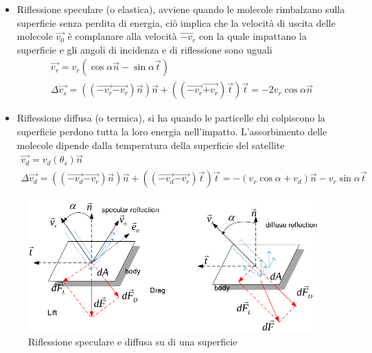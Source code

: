 \begin{itemize}
  \item Riflessione speculare (o elastica), avviene quando le molecole
  rimbalzano sulla superficie senza perdita di energia, ciò implica che la
  velocità di uscita delle molecole $\vec{v_0}$ è complanare alla velocità
  $\vec{-v_r}$ con la quale impattano la superficie e gli angoli di incidenza e
  di riflessione sono uguali
\begin{equation}
\begin{array}{l}
\vec{v_r}=v_r(\cos{\alpha \vec{n}}-\sin{\alpha \vec{t}}) \\
\Delta \vec{v_s}=((\vec{-v_r}\vec{-v_r})\vec{n})\vec{n} +
((\vec{-v_r}\vec{+v_r})\vec{t})\vec{t} = -2v_r\cos{\alpha \vec{n}}
\end{array}
\label{eq:specular}
\end{equation}
  \item Riflessione diffusa (o termica), si ha quando le particelle chi
  colpiscono la superficie perdono tutta la loro energia nell'impatto.
  L'assorbimento delle molecole dipende dalla temperatura della superficie del
  satellite
\begin{equation}
\begin{array}{l}
\vec{v_d}=v_d(\theta_s)\vec{n} \\
\Delta\vec{v_d}=((\vec{-v_d}\vec{-v_r})\vec{n})\vec{n} +
((\vec{-v_d}\vec{-v_r})\vec{t})\vec{t}
= -(v_r\cos{\alpha}+v_d)\vec{n}-v_r\sin{\alpha}\vec{t}
\end{array}
\label{eq:diffusion}
\end{equation}
\end{itemize}

\begin{figure}[htp]
\begin{center}
  \includegraphics[width=\textwidth]{modelling/orbit_dynamics/image/riflessione.png}
  \caption{Riflessione speculare e diffusa su di una superficie}
  \label{fig:riflessione}
\end{center}
\end{figure}

